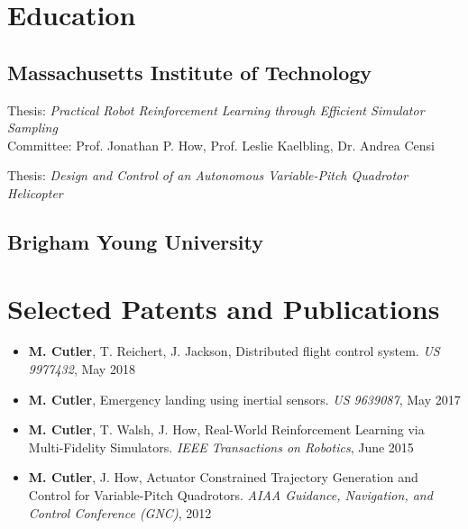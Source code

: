 \documentclass[letterpaper]{deedy-resume} %
\begin{document}
\begin{minipage}[t]{0.68\textwidth}
\sectionspace %




\section{Education}

\subsection{Massachusetts Institute of Technology}

Thesis:  \emph{Practical Robot Reinforcement Learning through Efficient
  Simulator Sampling} \\
Committee: Prof. Jonathan P. How, Prof. Leslie Kaelbling, Dr. Andrea Censi

\sectionspace %

Thesis:  \emph{Design and Control of an Autonomous Variable-Pitch Quadrotor Helicopter} \\

\sectionspace %

\subsection{Brigham Young University}


\sectionspace %



\section{Selected Patents and Publications}

\begin{itemize}
\item \textbf{M. Cutler}, T. Reichert, J. Jackson, Distributed flight control system. \emph{US 9977432}, May 2018
\item \textbf{M. Cutler}, Emergency landing using inertial sensors. \emph{US 9639087}, May 2017
\item \textbf{M. Cutler}, T. Walsh, J. How, Real-World Reinforcement Learning
  via Multi-Fidelity Simulators. \emph{IEEE Transactions on Robotics}, June 2015
\item \textbf{M. Cutler}, J. How, Actuator Constrained Trajectory Generation
  and Control for Variable-Pitch Quadrotors. \emph{AIAA Guidance, Navigation,
    and Control Conference (GNC)}, 2012
\end{itemize}


\end{minipage}
\end{document}
